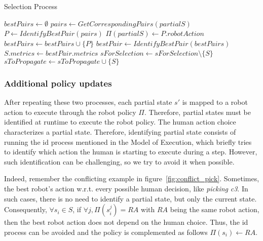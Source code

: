 \begin{algorithm}[h]
\caption{Selection Process}\label{alg:selection}
\begin{algorithmic}[1]

        \State $bestPairs \gets \emptyset$
            \State $pairs \gets GetCorrespondingPairs(partialS)$
            \State $P \gets IdentifyBestPair(pairs)$ 
            \State $\Pi(partialS) \gets P.robotAction$
            \State $bestPairs \gets bestPairs \cup \{P\}$
        \EndFor
        \State 
        \State $bestPair \gets IdentifyBestPair(bestPairs)$
        \State 
        \State $S.metrics \gets bestPair.metrics$
        \State $sForSelection \gets sForSelection \setminus \{S\}$
        \State $sToPropagate \gets sToPropagate \cup \{S\}$
    \EndIf
\EndFor

\end{algorithmic}
\end{algorithm}

    \subsubsection*{Additional policy updates}

After repeating these two processes,  each partial state $s'$ is mapped to a robot action to execute through the robot policy $\Pi$. Therefore, partial states must be identified at runtime to execute the robot policy. 
The human action choice characterizes a partial state. Therefore, identifying partial state consists of running the \acrshort{id} process mentioned in the Model of Execution, which briefly tries to identify which action the human is starting to execute during a step. However, such identification can be challenging, so we try to avoid it when possible. 

Indeed, remember the conflicting example in figure~\ref{fig:conflict_pick}. Sometimes, the best robot's action w.r.t. every possible human decision, like \textit{picking} \textit{c3}. In such cases, there is no need to identify a partial state, but only the current state. 
Consequently, $\forall s_i \in S$, if $\forall j, \Pi(s_i^j) = RA$ with $RA$ being the same robot action, then the best robot action does not depend on the human choice. Thus, the \acrshort{id} process can be avoided and the policy is complemented as follows $\Pi(s_i) \gets RA$.

